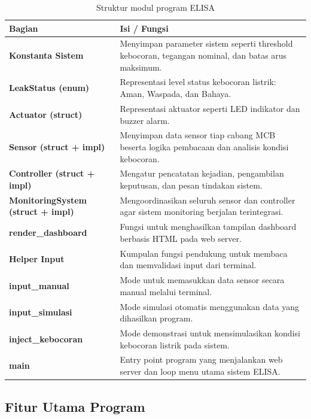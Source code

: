 \documentclass[12pt,a4paper]{article}
\begin{document}
\begin{table}[H]
    \centering
    \caption{Struktur modul program ELISA}
    \small
    \begin{tabularx}{\textwidth}{>{\bfseries}lX}
        \toprule
        Bagian & Isi / Fungsi \\
        \midrule
        Konstanta Sistem       & Menyimpan parameter sistem seperti threshold kebocoran, tegangan nominal, dan batas arus maksimum. \\[4pt]
        LeakStatus (enum)      & Representasi level status kebocoran listrik: Aman, Waspada, dan Bahaya. \\[4pt]
        Actuator (struct)      & Representasi aktuator seperti LED indikator dan buzzer alarm. \\[4pt]
        Sensor (struct + impl) & Menyimpan data sensor tiap cabang MCB beserta logika pembacaan dan analisis kondisi kebocoran. \\[4pt]
        Controller (struct + impl) & Mengatur pencatatan kejadian, pengambilan keputusan, dan pesan tindakan sistem. \\[4pt]
        MonitoringSystem (struct + impl) & Mengoordinasikan seluruh sensor dan controller agar sistem monitoring berjalan terintegrasi. \\[4pt]
        render\_dashboard      & Fungsi untuk menghasilkan tampilan dashboard berbasis HTML pada web server. \\[4pt]
        Helper Input           & Kumpulan fungsi pendukung untuk membaca dan memvalidasi input dari terminal. \\[4pt]
        input\_manual          & Mode untuk memasukkan data sensor secara manual melalui terminal. \\[4pt]
        input\_simulasi        & Mode simulasi otomatis menggunakan data yang dihasilkan program. \\[4pt]
        inject\_kebocoran      & Mode demonstrasi untuk mensimulasikan kondisi kebocoran listrik pada sistem. \\[4pt]
        main                   & Entry point program yang menjalankan web server dan loop menu utama sistem ELISA. \\
        \bottomrule
    \end{tabularx}
\end{table}

\subsection{Fitur Utama Program}
\end{document}
